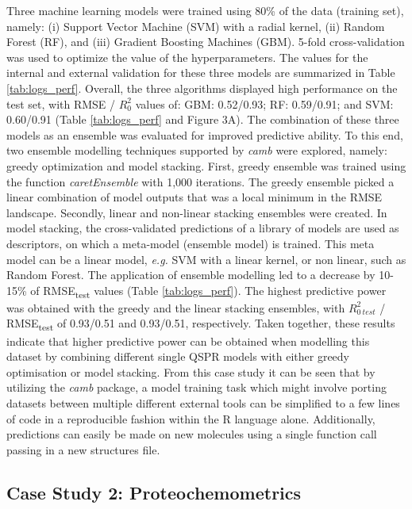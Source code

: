 \documentclass{bmcart}
\begin{document}
Three machine learning models were trained using 80\% of the
data (training set), namely: 
(i) Support Vector Machine (SVM) with a radial kernel,
(ii) Random Forest (RF), and
(iii) Gradient Boosting Machines (GBM).
5-fold cross-validation was used to optimize the value of the hyperparameters.
The values for the internal and external validation for these three models are summarized in Table \ref{tab:logs_perf}.
Overall, the three algorithms displayed high performance on the test set,
with RMSE / $R^{2}_{0}$ values of:  GBM: 0.52/0.93; RF: 0.59/0.91; and SVM: 0.60/0.91  (Table \ref{tab:logs_perf} and Figure 3A). 
The combination of these three models as an ensemble was evaluated for improved predictive ability.
To this end, two ensemble modelling techniques supported by {\it camb} were explored,
namely: greedy optimization and model stacking.
First, greedy ensemble was trained using the function {\it caretEnsemble} with 1,000 iterations. 
The greedy ensemble picked a linear combination of model outputs that was a local minimum in the RMSE landscape. 
Secondly, linear and non-linear stacking ensembles were created.
In model stacking, the cross-validated predictions of a library of models are used as descriptors,
on which a meta-model (ensemble model) is trained.
This meta model can be a linear model, {\it e.g.} SVM with a linear kernel,
or non linear, such as Random Forest.
The application of ensemble modelling led to a decrease by 10-15\%
of RMSE\textsubscript{test} values (Table \ref{tab:logs_perf}).
The highest predictive power was obtained with the greedy and the linear stacking ensembles,
with $R^{2}_{0\ test}$ / RMSE\textsubscript{test} of 0.93/0.51 and 0.93/0.51, respectively.
Taken together, these results indicate that higher predictive power can be obtained when modelling this dataset
by combining different single QSPR models with either greedy optimisation or model stacking.
From this case study it can be seen that by utilizing the \textit{camb} package, a model training task which might involve
porting datasets between multiple different external tools can be simplified to a few lines of code in a reproducible fashion within the R language alone. Additionally, predictions can easily be made on new molecules using a single function call passing in a new structures file.

\subsection*{Case Study 2: Proteochemometrics}
\end{document}
